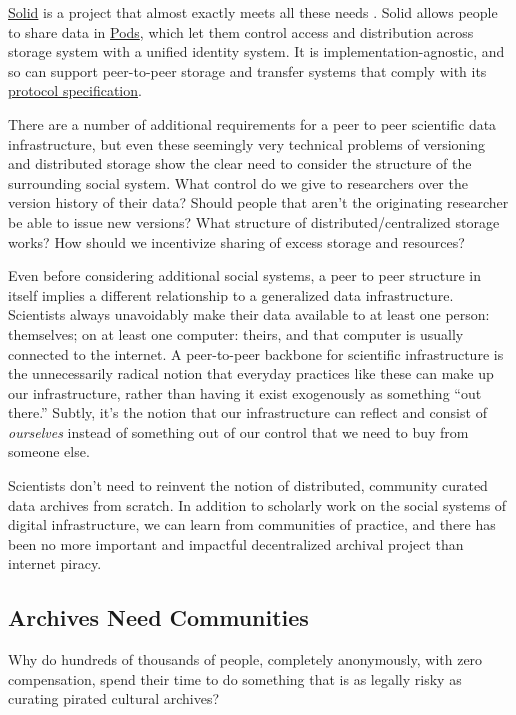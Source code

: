 \documentclass[notoc]{tufte-book}
\begin{document}
\href{https://solidproject.org/}{Solid} is a project that almost exactly
meets all these needs \citep{capadisliSolidProtocol2020, sambraSolidPlatformDecentralized2016, SolidP2PFoundation} . Solid
allows people to share data in
\href{https://solidproject.org/about}{Pods}, which let them control
access and distribution across storage system with a unified identity
system. It is implementation-agnostic, and so can support peer-to-peer
storage and transfer systems that comply with its
\href{https://solidproject.org/TR/protocol}{protocol specification}.

There are a number of additional requirements for a peer to peer
scientific data infrastructure, but even these seemingly very technical
problems of versioning and distributed storage show the clear need to
consider the structure of the surrounding social system. What control do
we give to researchers over the version history of their data? Should
people that aren't the originating researcher be able to issue new
versions? What structure of distributed/centralized storage works? How
should we incentivize sharing of excess storage and resources?

Even before considering additional social systems, a peer to peer
structure in itself implies a different relationship to a generalized
data infrastructure. Scientists always unavoidably make their data
available to at least one person: themselves; on at least one computer:
theirs, and that computer is usually connected to the internet. A
peer-to-peer backbone for scientific infrastructure is the unnecessarily
radical notion that everyday practices like these can make up our
infrastructure, rather than having it exist exogenously as something
``out there.'' Subtly, it's the notion that our infrastructure can
reflect and consist of \emph{ourselves} instead of something out of our
control that we need to buy from someone else.

Scientists don't need to reinvent the notion of distributed, community
curated data archives from scratch. In addition to scholarly work on the
social systems of digital infrastructure, we can learn from communities
of practice, and there has been no more important and impactful
decentralized archival project than internet piracy.


\subsection{Archives Need
Communities}

Why do hundreds of thousands of people, completely anonymously, with
zero compensation, spend their time to do something that is as legally
risky as curating pirated cultural archives?
\end{document}

